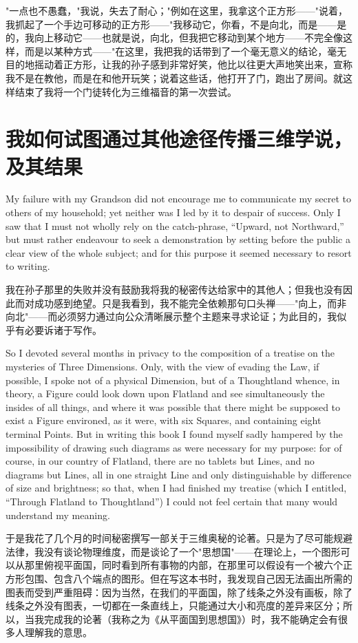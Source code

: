 \documentclass[12pt,UTF8]{ctexbook}
\begin{document}
"一点也不愚蠢，"我说，失去了耐心；"例如在这里，我拿这个正方形——"说着，我抓起了一个手边可移动的正方形——"我移动它，你看，不是向北，而是——是的，我向上移动它——也就是说，向北，但我把它移动到某个地方——不完全像这样，而是以某种方式——"在这里，我把我的话带到了一个毫无意义的结论，毫无目的地摇动着正方形，让我的孙子感到非常好笑，他比以往更大声地笑出来，宣称我不是在教他，而是在和他开玩笑；说着这些话，他打开了门，跑出了房间。就这样结束了我将一个门徒转化为三维福音的第一次尝试。

\chapter{我如何试图通过其他途径传播三维学说，及其结果}

My failure with my Grandson did not encourage me to communicate my secret to others of my household; yet neither was I led by it to despair of success. Only I saw that I must not wholly rely on the catch-phrase, ``Upward, not Northward,'' but must rather endeavour to seek a demonstration by setting before the public a clear view of the whole subject; and for this purpose it seemed necessary to resort to writing.

我在孙子那里的失败并没有鼓励我将我的秘密传达给家中的其他人；但我也没有因此而对成功感到绝望。只是我看到，我不能完全依赖那句口头禅——"向上，而非向北"——而必须努力通过向公众清晰展示整个主题来寻求论证；为此目的，我似乎有必要诉诸于写作。

So I devoted several months in privacy to the composition of a treatise on the mysteries of Three Dimensions. Only, with the view of evading the Law, if possible, I spoke not of a physical Dimension, but of a Thoughtland whence, in theory, a Figure could look down upon Flatland and see simultaneously the insides of all things, and where it was possible that there might be supposed to exist a Figure environed, as it were, with six Squares, and containing eight terminal Points. But in writing this book I found myself sadly hampered by the impossibility of drawing such diagrams as were necessary for my purpose: for of course, in our country of Flatland, there are no tablets but Lines, and no diagrams but Lines, all in one straight Line and only distinguishable by difference of size and brightness; so that, when I had finished my treatise (which I entitled, ``Through Flatland to Thoughtland'') I could not feel certain that many would understand my meaning.

于是我花了几个月的时间秘密撰写一部关于三维奥秘的论著。只是为了尽可能规避法律，我没有谈论物理维度，而是谈论了一个"思想国"——在理论上，一个图形可以从那里俯视平面国，同时看到所有事物的内部，在那里可以假设有一个被六个正方形包围、包含八个端点的图形。但在写这本书时，我发现自己因无法画出所需的图表而受到严重阻碍：因为当然，在我们的平面国，除了线条之外没有画板，除了线条之外没有图表，一切都在一条直线上，只能通过大小和亮度的差异来区分；所以，当我完成我的论著（我称之为《从平面国到思想国》）时，我不能确定会有很多人理解我的意思。
\end{document}
